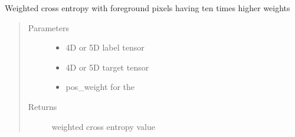 \documentclass[letterpaper,10pt,english]{sphinxmanual}
\begin{document}

\begin{fulllineitems}
\label{\detokenize{index:unet.loss.weighted_cross_entropy_fun}}
Weighted cross entropy with foreground pixels having ten times higher weights
\begin{quote}\begin{description}
\item[{Parameters}] \leavevmode\begin{itemize}
\item {} 
 \textendash{} 4D or 5D label tensor

\item {} 
 \textendash{} 4D or 5D target tensor

\item {} 
 \textendash{} pos\_weight for the 

\end{itemize}

\item[{Returns}] \leavevmode
weighted cross entropy value

\end{description}\end{quote}

\end{fulllineitems}

\end{document}

